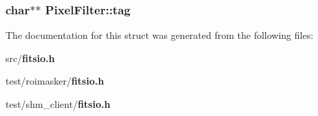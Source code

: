\subsubsection{\setlength{\rightskip}{0pt plus 5cm}char$\ast$$\ast$ \bf{Pixel\-Filter::tag}}\label{structPixelFilter_71b96f3e8b70a5fefeca1fa33a2bf716}




The documentation for this struct was generated from the following files:\begin{CompactItemize}
\item 
src/\bf{fitsio.h}\item 
test/roimasker/\bf{fitsio.h}\item 
test/shm\_\-client/\bf{fitsio.h}\end{CompactItemize}
